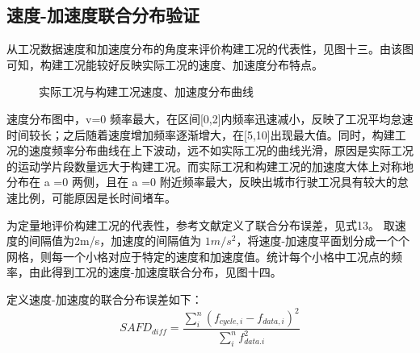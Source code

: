 \documentclass[bwprint]{gmcmthesis}
\begin{document}
\subsection{速度-加速度联合分布验证}
从工况数据速度和加速度分布的角度来评价构建工况的代表性，见图十三。由该图可知，构建工况能较好反映实际工况的速度、加速度分布特点。
\begin{figure}[htbp] %
\centering
{}
\caption{实际工况与构建工况速度、加速度分布曲线}
\label{f5}
\end{figure}

速度分布图中，v=0 频率最大，在区间[0,2]内频率迅速减小，反映了工况平均怠速时间较长；之后随着速度增加频率逐渐增大，在[5,10]出现最大值。同时，构建工况的速度频率分布曲线在上下波动，远不如实际工况的曲线光滑，原因是实际工况的运动学片段数量远大于构建工况。而实际工况和构建工况的加速度大体上对称地分布在 a =0 两侧，且在 a =0 附近频率最大，反映出城市行驶工况具有较大的怠速比例，可能原因是长时间堵车。

为定量地评价构建工况的代表性，参考文献\cite{c6}定义了联合分布误差，见式13。 取速度的间隔值为2m/s，加速度的间隔值为 $1m/s^2$，将速度-加速度平面划分成一个个网格，则每一个小格对应于特定的速度和加速度值。统计每个小格中工况点的频率，由此得到工况的速度-加速度联合分布，见图十四。

定义速度-加速度的联合分布误差如下：
\begin{equation}
SAFD_{diff}=\frac{\sum\limits^n_i(f_{cycle,i}-f_{data,i})^2}{\sum\limits^n_if_{data.i}^2}
\end{equation}
\end{document}
